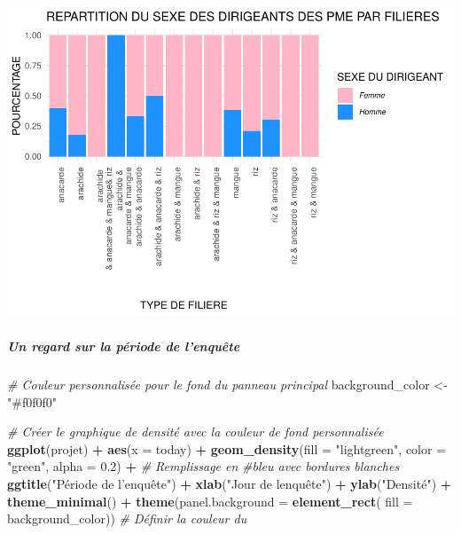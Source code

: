 \documentclass[
]{article}
\newenvironment{Shaded}{\begin{snugshade}}{\end{snugshade}}
\newcommand{\AttributeTok}[1]{\textcolor[rgb]{0.13,0.29,0.53}{#1}}
\newcommand{\CommentTok}[1]{\textcolor[rgb]{0.56,0.35,0.01}{\textit{#1}}}
\newcommand{\FloatTok}[1]{\textcolor[rgb]{0.00,0.00,0.81}{#1}}
\newcommand{\FunctionTok}[1]{\textcolor[rgb]{0.13,0.29,0.53}{\textbf{#1}}}
\newcommand{\NormalTok}[1]{#1}
\newcommand{\OtherTok}[1]{\textcolor[rgb]{0.56,0.35,0.01}{#1}}
\newcommand{\SpecialCharTok}[1]{\textcolor[rgb]{0.81,0.36,0.00}{\textbf{#1}}}
\newcommand{\StringTok}[1]{\textcolor[rgb]{0.31,0.60,0.02}{#1}}
\begin{document}
\begin{center}\includegraphics{Projet_R_ISE_1_files/figure-latex/unnamed-chunk-28-1} \end{center}

\hfill\break

\hypertarget{un-regard-sur-la-puxe9riode-de-lenquuxeate}{%
\subparagraph{Un regard sur la période de
l'enquête}\label{un-regard-sur-la-puxe9riode-de-lenquuxeate}}

\hfill\break

\begin{Shaded}
\begin{Highlighting}[]
\CommentTok{\# Couleur personnalisée pour le fond du panneau principal}
\NormalTok{background\_color }\OtherTok{\textless{}{-}} \StringTok{"\#f0f0f0"}

\CommentTok{\# Créer le graphique de densité avec la couleur de fond personnalisée}
\FunctionTok{ggplot}\NormalTok{(projet) }\SpecialCharTok{+}
  \FunctionTok{aes}\NormalTok{(}\AttributeTok{x =}\NormalTok{ today) }\SpecialCharTok{+}
  \FunctionTok{geom\_density}\NormalTok{(}\AttributeTok{fill =} \StringTok{"lightgreen"}\NormalTok{, }
               \AttributeTok{color =} \StringTok{"green"}\NormalTok{, }\AttributeTok{alpha =} \FloatTok{0.2}\NormalTok{) }\SpecialCharTok{+}  \CommentTok{\# Remplissage en  }
                                              \CommentTok{\#bleu avec bordures blanches}
  \FunctionTok{ggtitle}\NormalTok{(}\StringTok{"Période de l’enquête"}\NormalTok{) }\SpecialCharTok{+}
  \FunctionTok{xlab}\NormalTok{(}\StringTok{"Jour de l\textquotesingle{}enquête"}\NormalTok{) }\SpecialCharTok{+}
  \FunctionTok{ylab}\NormalTok{(}\StringTok{"Densité"}\NormalTok{) }\SpecialCharTok{+}
  \FunctionTok{theme\_minimal}\NormalTok{() }\SpecialCharTok{+}
  \FunctionTok{theme}\NormalTok{(}\AttributeTok{panel.background =} \FunctionTok{element\_rect}\NormalTok{(}
    \AttributeTok{fill =}\NormalTok{ background\_color))  }\CommentTok{\# Définir la couleur du }
\end{Highlighting}
\end{Shaded}
\end{document}

